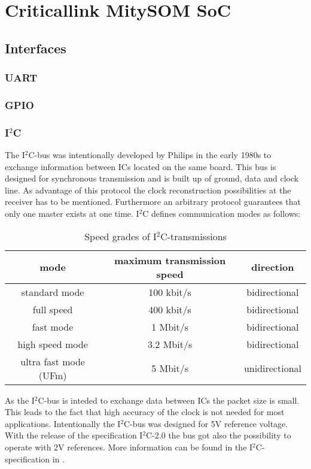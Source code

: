 \chapter{Criticallink MitySOM SoC}

\section{Interfaces}
\subsection{UART}
\subsection{GPIO}
\subsection{I$^2$C}
The I$^2$C-bus was intentionally developed by Philips in the early 1980s to exchange information between ICs located on the same board. This bus is designed for synchronous transmission and is built up of ground, data and clock line. As advantage of this protocol the clock reconstruction possibilities at the receiver has to be mentioned. Furthermore an arbitrary protocol guarantees that only one master exists at one time.\cite{Wue06} I$^2$C defines communication modes as follows:
\begin{table}
\begin{center}
\begin{tabular}{|c||c|c|}
\hline
mode & maximum transmission speed & direction\\
\hline\hline
standard mode & 100 kbit/s & bidirectional\\
\hline
full speed & 400 kbit/s & bidirectional\\
\hline
fast mode & 1 Mbit/s & bidirectional\\
\hline
high speed mode & 3.2 Mbit/s & bidirectional\\
\hline
ultra fast mode (UFm) & 5 Mbit/s & unidirectional\\
\hline
\end{tabular}
\caption{Speed grades of I$^2$C-transmissions\cite{I2Cspeed}}
\label{tab:rsstates}
\end{center}
\end{table}
As the I$^2$C-bus is inteded to exchange data between ICs the packet size is small. This leads to the fact that high accuracy of the clock is not needed for most applications.\cite{I2Cspeed} Intentionally the I$^2$C-bus was designed for 5V reference voltage. With the release of the specification I$^2$C-2.0 the bus got also the possibility to operate with 2V references.\cite{I2Cvoltage}
More information can be found in the I$^2$C-specification in \cite{I2Cspec}.
